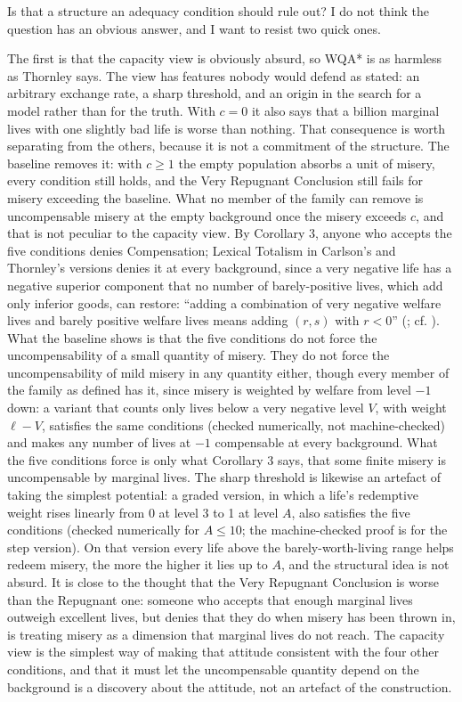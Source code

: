 \documentclass[
  11pt,
  letterpaper,
  DIV=11,
  numbers=noendperiod,
  twoside]{scrartcl}
\begin{document}
Is that a structure an adequacy condition should rule out? I do not
think the question has an obvious answer, and I want to resist two quick
ones.

The first is that the capacity view is obviously absurd, so WQA* is as
harmless as Thornley says. The view has features nobody would defend as
stated: an arbitrary exchange rate, a sharp threshold, and an origin in
the search for a model rather than for the truth. With \(c = 0\) it also
says that a billion marginal lives with one slightly bad life is worse
than nothing. That consequence is worth separating from the others,
because it is not a commitment of the structure. The baseline removes
it: with \(c \geq 1\) the empty population absorbs a unit of misery,
every condition still holds, and the Very Repugnant Conclusion still
fails for misery exceeding the baseline. What no member of the family
can remove is uncompensable misery at the empty background once the
misery exceeds \(c\), and that is not peculiar to the capacity view. By
Corollary 3, anyone who accepts the five conditions denies Compensation;
Lexical Totalism in Carlson's and Thornley's versions denies it at every
background, since a very negative life has a negative superior component
that no number of barely-positive lives, which add only inferior goods,
can restore: ``adding a combination of very negative welfare lives and
barely positive welfare lives means adding \((r, s)\) with \(r < 0\)''
(; cf.
). What the baseline
shows is that the five conditions do not force the uncompensability of a
small quantity of misery. They do not force the uncompensability of mild
misery in any quantity either, though every member of the family as
defined has it, since misery is weighted by welfare from level \(-1\)
down: a variant that counts only lives below a very negative level
\(V\), with weight \(\ell - V\), satisfies the same conditions (checked
numerically, not machine-checked) and makes any number of lives at
\(-1\) compensable at every background. What the five conditions force
is only what Corollary 3 says, that some finite misery is uncompensable
by marginal lives. The sharp threshold is likewise an artefact of taking
the simplest potential: a graded version, in which a life's redemptive
weight rises linearly from 0 at level 3 to 1 at level \(A\), also
satisfies the five conditions (checked numerically for \(A \leq 10\);
the machine-checked proof is for the step version). On that version
every life above the barely-worth-living range helps redeem misery, the
more the higher it lies up to \(A\), and the structural idea is not
absurd. It is close to the thought that the Very Repugnant Conclusion is
worse than the Repugnant one: someone who accepts that enough marginal
lives outweigh excellent lives, but denies that they do when misery has
been thrown in, is treating misery as a dimension that marginal lives do
not reach. The capacity view is the simplest way of making that attitude
consistent with the four other conditions, and that it must let the
uncompensable quantity depend on the background is a discovery about the
attitude, not an artefact of the construction.
\end{document}
